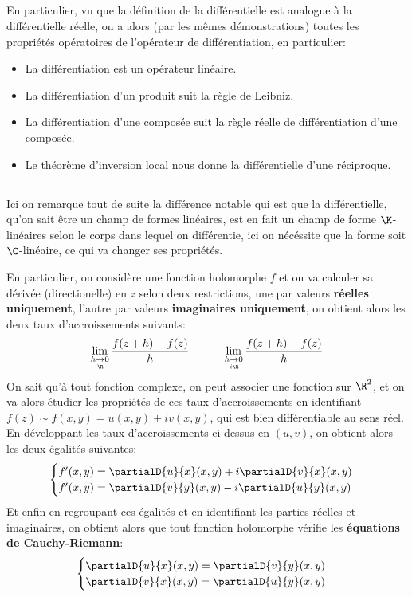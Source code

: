 \subsection*{}
En particulier, vu que la définition de la différentielle est analogue à la différentielle réelle, on a alors (par les mêmes démonstrations) toutes les propriétés opératoires de l'opérateur de différentiation, en particulier:
\begin{itemize}
   \item La différentiation est un opérateur linéaire.
   \item La différentiation d'un produit suit la règle de Leibniz.
   \item La différentiation d'une composée suit la règle réelle de différentiation d'une composée.
   \item Le théorème d'inversion local nous donne la différentielle d'une réciproque.
\end{itemize}

\subsection*{}
Ici on remarque tout de suite la différence notable qui est que la différentielle, qu'on sait être un champ de formes linéaires, est en fait un champ de forme \(\K\)-linéaires selon le corps dans lequel on différentie, ici on nécéssite que la forme soit \(\C\)-linéaire, ce qui va changer ses propriétés.\<

En particulier, on considère une fonction holomorphe \(f\) et on va calculer sa dérivée (directionelle) en \(z\) selon deux restrictions, une par valeurs \textbf{réelles uniquement}, l'autre par valeurs \textbf{imaginaires uniquement}, on obtient alors les deux taux d'accroissements suivants:
\[
   \lim_{h \underset{\R}{\rightarrow} 0} \frac{f(z + h) - f(z)}{h} \quad \quad \quad \lim_{h \underset{i\R}{\rightarrow} 0} \frac{f(z + h) - f(z)}{h}
\]
On sait qu'à tout fonction complexe, on peut associer une fonction sur \(\R^2\), et on va alors étudier les propriétés de ces taux d'accroissements en identifiant \(f(z) \sim f(x, y) = u(x, y) + iv(x, y)\), qui est bien différentiable au sens réel. En développant les taux d'accroissements ci-dessus en \((u, v)\), on obtient alors les deux égalités suivantes:
\[
   \begin{cases}
      f'(x, y) = \partialD{u}{x}(x, y) + i\partialD{v}{x}(x, y)\\
      f'(x, y) = \partialD{v}{y}(x, y) - i\partialD{u}{y}(x, y)
   \end{cases}
\]
Et enfin en regroupant ces égalités et en identifiant les parties réelles et imaginaires, on obtient alors que tout fonction holomorphe vérifie les \textbf{équations de Cauchy-Riemann}:
\[
   \begin{cases}
      \partialD{u}{x}(x, y) = \partialD{v}{y}(x, y)\\
      \partialD{v}{x}(x, y) = \partialD{u}{y}(x, y)
   \end{cases}
\]
\pagebreak 
